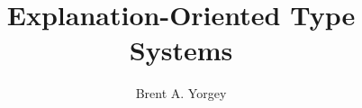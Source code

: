 \documentclass[sigplan, screen]{acmart}\settopmatter{printccs=false,printacmref=false}
\begin{document}
\title{Explanation-Oriented Type Systems}



\author{Brent A. Yorgey}





\maketitle
\end{document}
